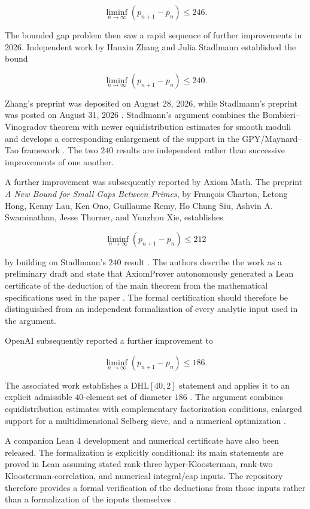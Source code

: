 \documentclass[11pt,a4paper]{article}
\theoremstyle{definition}
\theoremstyle{remark}
\begin{document}
$$
    \liminf_{n\to\infty}(p_{n+1}-p_n)\le246.
$$

The bounded gap problem then saw a rapid sequence of further
improvements in 2026.  Independent work by Hanxin Zhang and Julia
Stadlmann established the bound

$$
    \liminf_{n\to\infty}(p_{n+1}-p_n)\le240.
$$

Zhang's preprint was deposited on August 28, 2026, while Stadlmann's
preprint was posted on August 31, 2026
\cite{zhang240,stadlmann2026}.  Stadlmann's argument combines the
Bombieri--Vinogradov theorem with newer equidistribution estimates for
smooth moduli and develops a corresponding enlargement of the support
in the GPY/Maynard--Tao framework \cite{stadlmann2026}.  The two
$240$ results are independent rather than successive improvements of
one another.

A further improvement was subsequently reported by Axiom Math.
The preprint \textit{A New Bound for Small Gaps Between Primes},
by François Charton, Letong Hong, Kenny Lau, Ken Ono, Guillaume Remy,
Ho Chung Siu, Ashvin A. Swaminathan, Jesse Thorner, and Yunzhou Xie,
establishes

$$
    \liminf_{n\to\infty}(p_{n+1}-p_n)\le212
$$

by building on Stadlmann's $240$ result \cite{axiom212}.  The authors
describe the work as a preliminary draft and state that AxiomProver
autonomously generated a Lean certificate of the deduction of the main
theorem from the mathematical specifications used in the paper
\cite{axiom212}.  The formal certification should therefore be
distinguished from an independent formalization of every analytic input
used in the argument.

OpenAI subsequently reported a further improvement to

$$
    \liminf_{n\to\infty}(p_{n+1}-p_n)\le186.
$$

The associated work establishes a $\mathrm{DHL}[40,2]$ statement and
applies it to an explicit admissible $40$-element set of diameter
$186$ \cite{openai2026}.  The argument combines equidistribution
estimates with complementary factorization conditions, enlarged
support for a multidimensional Selberg sieve, and a numerical
optimization \cite{openai2026}.

A companion Lean 4 development and numerical certificate have also
been released.  The formalization is explicitly conditional: its
main statements are proved in Lean assuming stated rank-three
hyper-Kloosterman, rank-two Kloosterman-correlation, and numerical
integral/cap inputs.  The repository therefore provides a formal
verification of the deductions from those inputs rather than a
formalization of the inputs themselves \cite{openaiPrimeGaps186}.
\end{document}
